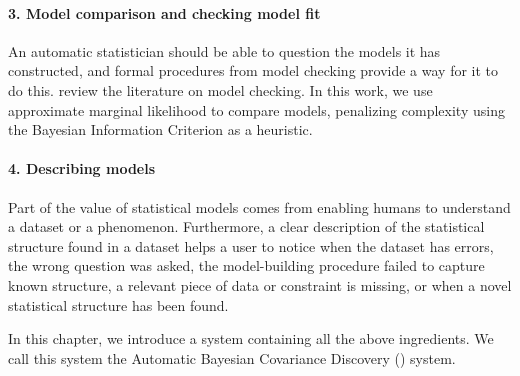 \paragraph{3. Model comparison and checking model fit}
An automatic statistician should be able to question the models it has constructed, and formal procedures from model checking provide a way for it to do this.
\citet{gelman2012philosophy} review the literature on model checking.
In this work, we use approximate marginal likelihood to compare models, penalizing complexity using the Bayesian Information Criterion as a heuristic.

\paragraph{4. Describing models}

Part of the value of statistical models comes from enabling humans to understand a dataset or a phenomenon.
Furthermore, a clear description of the statistical structure found in a dataset helps a user to notice when the dataset has errors, the wrong question was asked, the model-building procedure failed to capture known structure, a relevant piece of data or constraint is missing, or when a novel statistical structure has been found.





In this chapter, we introduce a system containing all the above ingredients.
We call this system the Automatic Bayesian Covariance Discovery (\procedurename{}) system.


